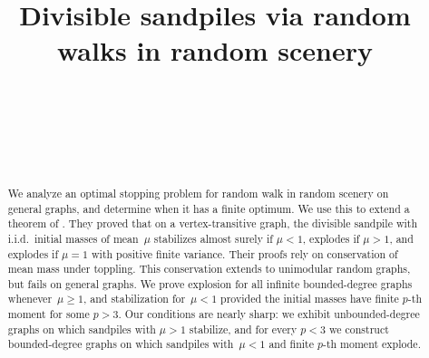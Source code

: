 \documentclass[aop]{imsart}
\theoremstyle{plain}
\theoremstyle{definition}
\begin{document}
\begin{frontmatter}
\title{Divisible sandpiles via random walks in random scenery}

\begin{aug}
\author[A]{~}
\author[B]{~}
\author[C]{~}

\address[A]{Department of Mathematics, University of Pennsylvania}

\address[B]{Beijing Institute of Mathematical Sciences and Applications}

\address[C]{Department of Mathematics, University of Innsbruck}
\end{aug}

\begin{abstract}
We analyze an optimal stopping problem for random walk in random scenery on general graphs, and determine when it has a finite optimum. We use this to extend a theorem of \citet*{div-sand-crit}. They proved that on a vertex-transitive graph, the divisible sandpile with i.i.d.\ initial masses of mean~$\mu$ stabilizes almost surely if $\mu < 1$, explodes if $\mu > 1$, and explodes if $\mu = 1$ with positive finite variance. Their proofs rely on conservation of mean mass under toppling. This conservation extends to unimodular random graphs, but fails on general graphs. We prove explosion for all infinite bounded-degree graphs whenever~$\mu \geq 1$, and stabilization for~$\mu<1$ provided the initial masses have finite $p$-th moment for some $p>3$. Our conditions are nearly sharp: we exhibit unbounded-degree graphs on which sandpiles with $\mu > 1$ stabilize, and for every $p < 3$ we construct bounded-degree graphs on which sandpiles with~$\mu < 1$ and finite $p$-th moment explode.
\end{abstract}

\begin{keyword}[class=MSC2020]
\end{keyword}

\begin{keyword}
\end{keyword}

\end{frontmatter}
\end{document}
